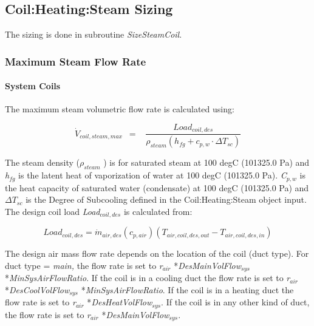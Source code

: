 \subsection{Coil:Heating:Steam Sizing}\label{coilheatingsteam-sizing}

The sizing is done in subroutine \emph{SizeSteamCoil}.

\subsubsection{Maximum Steam Flow Rate}\label{maximum-steam-flow-rate}

\paragraph{System Coils}\label{system-coils-2}

The maximum steam volumetric flow rate is calculated using:

\begin{equation}
{\dot V_{coil,steam,max}}\,\,\, = \,\,\,\,\,\frac{{Loa{d_{coil,des}}}}{{{\rho_{steam}}\left( {{h_{fg}} + {c_{p,w}}\cdot \Delta {T_{sc}}} \right)}}
\end{equation}

The steam density (\({\rho_{steam}}\) ) is for saturated steam at 100 degC (101325.0 Pa) and \emph{h\(_{fg}\)} is the latent heat of vaporization of water at 100 degC (101325.0 Pa). \emph{C\(_{p,w}\)} is the heat capacity of saturated water (condensate) at 100 degC (101325.0 Pa) and \(\Delta {T_{sc}}\) is the Degree of Subcooling defined in the Coil:Heating:Steam object input. The design coil load \emph{Load\(_{coil,des}\)} is calculated from:

\begin{equation}
Loa{d_{coil,des}} = {\dot m_{air,des}}({c_{p,air}})({T_{air,coil,des,out}} - {T_{air,coil,des,in}})
\end{equation}

The design air mass flow rate depends on the location of the coil (duct type). For duct type = \emph{main,} the flow rate is set to \emph{r\(_{air}\)} *\emph{DesMainVolFlow\(_{sys}\)} *\emph{MinSysAirFlowRatio}. If the coil is in a cooling duct the flow rate is set to \emph{r\(_{air}\)} *\emph{DesCoolVolFlow\(_{sys}\)} *\emph{MinSysAirFlowRatio}. If the coil is in a heating duct the flow rate is set to \emph{r\(_{air}\)} *\emph{DesHeatVolFlow\(_{sys}\)}. If the coil is in any other kind of duct, the flow rate is set to \emph{r\(_{air}\)} *\emph{DesMainVolFlow\(_{sys}\)}.

